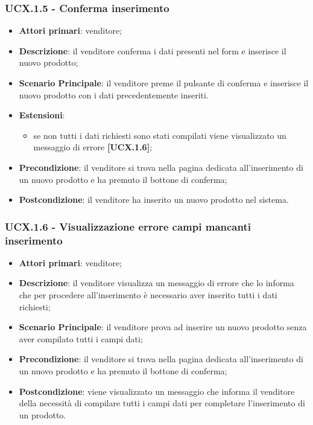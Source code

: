 \subsubsection{UCX.1.5 - Conferma inserimento}
\begin{itemize}
\item \textbf{Attori primari}: venditore;
\item \textbf{Descrizione}: il venditore conferma i dati presenti nel form e inserisce il nuovo prodotto;
\item \textbf{Scenario Principale}: il venditore preme il pulsante di conferma e inserisce il nuovo prodotto con i dati precedentemente inseriti.
\item \textbf{Estensioni}: 
\begin{itemize}
	\item se non tutti i dati richiesti sono stati compilati viene visualizzato un messaggio di errore \textbf{[UCX.1.6]};
\end{itemize} 
\item \textbf{Precondizione}: il venditore si trova nella pagina dedicata all'inserimento di un nuovo prodotto e ha premuto il bottone di conferma;
\item \textbf{Postcondizione}: il venditore ha inserito un nuovo prodotto nel sistema.
\end{itemize}

\subsubsection{UCX.1.6 - Visualizzazione errore campi mancanti inserimento}
\begin{itemize}
\item \textbf{Attori primari}: venditore;
\item \textbf{Descrizione}: il venditore visualizza un messaggio di errore che lo informa che per procedere all'inserimento è necessario aver inserito tutti i dati richiesti;
\item \textbf{Scenario Principale}: il venditore prova ad inserire un nuovo prodotto senza aver compilato tutti i campi dati;
\item \textbf{Precondizione}: il venditore si trova nella pagina dedicata all'inserimento di un nuovo prodotto e ha premuto il bottone di conferma;
\item \textbf{Postcondizione}: viene visualizzato un messaggio che informa il venditore della necessità di compilare tutti i campi dati per completare l'inserimento di un prodotto.
\end{itemize}


